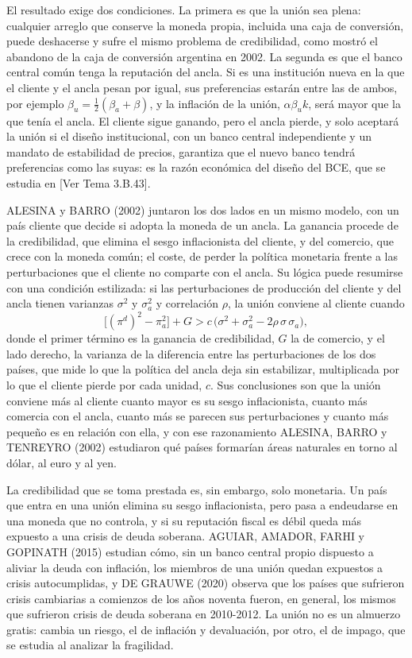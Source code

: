 \documentclass[10pt,a4paper]{article}
\newcommand{\authorfont}[1]{{\fontfamily{EBGaramond-TLF}\selectfont #1}}
\begin{document}
El resultado exige dos condiciones. La primera es que la unión sea plena: cualquier arreglo que conserve la moneda propia, incluida una caja de conversión, puede deshacerse y sufre el mismo problema de credibilidad, como mostró el abandono de la caja de conversión argentina en 2002. La segunda es que el banco central común tenga la reputación del ancla. Si es una institución nueva en la que el cliente y el ancla pesan por igual, sus preferencias estarán entre las de ambos, por ejemplo $\beta_u=\tfrac12(\beta_a+\beta)$, y la inflación de la unión, $\alpha\beta_u k$, será mayor que la que tenía el ancla. El cliente sigue ganando, pero el ancla pierde, y solo aceptará la unión si el diseño institucional, con un banco central independiente y un mandato de estabilidad de precios, garantiza que el nuevo banco tendrá preferencias como las suyas: es la razón económica del diseño del BCE, que se estudia en [\authorfont{Ver Tema 3.B.43}].

ALESINA y BARRO (2002) juntaron los dos lados en un mismo modelo, con un país cliente que decide si adopta la moneda de un ancla. La ganancia procede de la credibilidad, que elimina el sesgo inflacionista del cliente, y del comercio, que crece con la moneda común; el coste, de perder la política monetaria frente a las perturbaciones que el cliente no comparte con el ancla. Su lógica puede resumirse con una condición estilizada: si las perturbaciones de producción del cliente y del ancla tienen varianzas $\sigma^2$ y $\sigma_a^2$ y correlación $\rho$, la unión conviene al cliente cuando
$$\big[(\pi^d)^2-\pi_a^2\big]+G>c\,\big(\sigma^2+\sigma_a^2-2\rho\,\sigma\,\sigma_a\big),$$
donde el primer término es la ganancia de credibilidad, $G$ la de comercio, y el lado derecho, la varianza de la diferencia entre las perturbaciones de los dos países, que mide lo que la política del ancla deja sin estabilizar, multiplicada por lo que el cliente pierde por cada unidad, $c$. Sus conclusiones son que la unión conviene más al cliente cuanto mayor es su sesgo inflacionista, cuanto más comercia con el ancla, cuanto más se parecen sus perturbaciones y cuanto más pequeño es en relación con ella, y con ese razonamiento ALESINA, BARRO y TENREYRO (2002) estudiaron qué países formarían áreas naturales en torno al dólar, al euro y al yen.

La credibilidad que se toma prestada es, sin embargo, solo monetaria. Un país que entra en una unión elimina su sesgo inflacionista, pero pasa a endeudarse en una moneda que no controla, y si su reputación fiscal es débil queda más expuesto a una crisis de deuda soberana. AGUIAR, AMADOR, FARHI y GOPINATH (2015) estudian cómo, sin un banco central propio dispuesto a aliviar la deuda con inflación, los miembros de una unión quedan expuestos a crisis autocumplidas, y DE GRAUWE (2020) observa que los países que sufrieron crisis cambiarias a comienzos de los años noventa fueron, en general, los mismos que sufrieron crisis de deuda soberana en 2010-2012. La unión no es un almuerzo gratis: cambia un riesgo, el de inflación y devaluación, por otro, el de impago, que se estudia al analizar la fragilidad.
\end{document}

